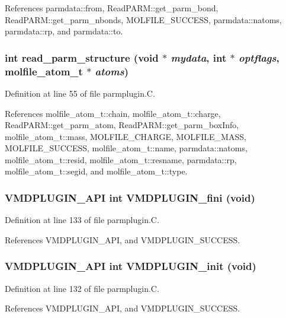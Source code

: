 References parmdata::from, Read\-PARM::get\_\-parm\_\-bond, Read\-PARM::get\_\-parm\_\-nbonds, MOLFILE\_\-SUCCESS, parmdata::natoms, parmdata::rp, and parmdata::to.
\subsubsection{\setlength{\rightskip}{0pt plus 5cm}int read\_\-parm\_\-structure (void $\ast$ {\em mydata}, int $\ast$ {\em optflags}, {\bf molfile\_\-atom\_\-t} $\ast$ {\em atoms})\hspace{0.3cm}{\tt  [static]}}\label{parmplugin_8C_a2}




Definition at line 55 of file parmplugin.C.

References molfile\_\-atom\_\-t::chain, molfile\_\-atom\_\-t::charge, Read\-PARM::get\_\-parm\_\-atom, Read\-PARM::get\_\-parm\_\-box\-Info, molfile\_\-atom\_\-t::mass, MOLFILE\_\-CHARGE, MOLFILE\_\-MASS, MOLFILE\_\-SUCCESS, molfile\_\-atom\_\-t::name, parmdata::natoms, molfile\_\-atom\_\-t::resid, molfile\_\-atom\_\-t::resname, parmdata::rp, molfile\_\-atom\_\-t::segid, and molfile\_\-atom\_\-t::type.
\subsubsection{\setlength{\rightskip}{0pt plus 5cm}VMDPLUGIN\_\-API int VMDPLUGIN\_\-fini (void)}\label{parmplugin_8C_a6}




Definition at line 133 of file parmplugin.C.

References VMDPLUGIN\_\-API, and VMDPLUGIN\_\-SUCCESS.
\subsubsection{\setlength{\rightskip}{0pt plus 5cm}VMDPLUGIN\_\-API int VMDPLUGIN\_\-init (void)}\label{parmplugin_8C_a5}




Definition at line 132 of file parmplugin.C.

References VMDPLUGIN\_\-API, and VMDPLUGIN\_\-SUCCESS.
